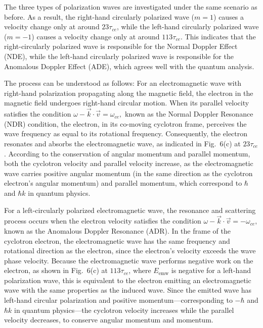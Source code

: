 \documentclass{cpbtex}
\begin{document}
\begin{CJK*}{GBK}{song}
The three types of polarization waves are investigated under the same scenario as before. As a result, the right-hand circularly polarized wave (\( m = 1 \)) causes a velocity change only at around \( 23\tau_{ce} \), while the left-hand circularly polarized wave (\( m = -1 \)) causes a velocity change only at around \( 113\tau_{ce} \). This indicates that the right-circularly polarized wave is responsible for the Normal Doppler Effect (NDE), while the left-hand circularly polarized wave is responsible for the Anomalous Doppler Effect (ADE), which agrees well with the quantum analysis.

The process can be understood as follows: For an electromagnetic wave with right-hand polarization propagating along the magnetic field, the electron in the magnetic field undergoes right-hand circular motion. When its parallel velocity satisfies the condition
\(
\omega - \vec{k} \cdot \vec{v} = \omega_{ce},
\)
known as the Normal Doppler Resonance (NDR) condition, the electron, in its co-moving cyclotron frame, perceives the wave frequency as equal to its rotational frequency. Consequently, the electron resonates and absorbs the electromagnetic wave, as indicated in Fig.~6(c) at \( 23\tau_{ce} \). According to the conservation of angular momentum and parallel momentum, both the cyclotron velocity and parallel velocity increase, as the electromagnetic wave carries positive angular momentum (in the same direction as the cyclotron electron's angular momentum) and parallel momentum, which correspond to \( \hbar \) and \( \hbar k \) in quantum physics.

For a left-circularly polarized electromagnetic wave, the resonance and scattering process occurs when the electron velocity satisfies the condition
\(
\omega - \vec{k} \cdot \vec{v} = -\omega_{ce},
\)
known as the Anomalous Doppler Resonance (ADR). In the frame of the cyclotron electron, the electromagnetic wave has the same frequency and rotational direction as the electron, since the electron's velocity exceeds the wave phase velocity. Because the electromagnetic wave performs negative work on the electron, as shown in Fig.~6(c) at \( 113\tau_{ce} \), where \( E_{\text{emw}} \) is negative for a left-hand polarization wave, this is equivalent to the electron emitting an electromagnetic wave with the same properties as the induced wave. Since the emitted wave has left-hand circular polarization and positive momentum---corresponding to \( -\hbar \) and \( \hbar k \) in quantum physics---the cyclotron velocity increases while the parallel velocity decreases, to conserve angular momentum and momentum.


\end{CJK*}
\end{document}

